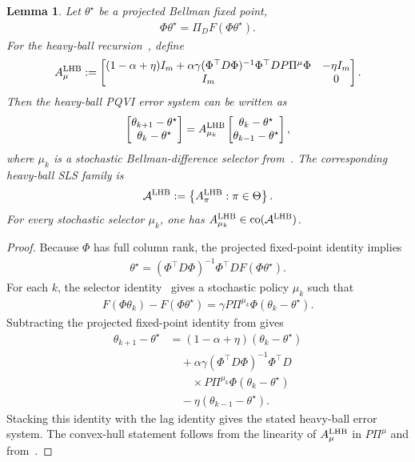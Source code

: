 \documentclass[letterpaper]{article}
\numberwithin{equation}{section}
\newtheorem{lemma}{Lemma}[section]
\newcommand{\co}{\operatorname{co}}
\begin{document}
\begin{lemma}
\label{lem:linear-fa-heavy-ball-switching-system}
Let $\theta^\star$ be a projected Bellman fixed point,
\begin{align*}
  \Phi\theta^\star=\Pi_D F(\Phi\theta^\star).
\end{align*}
For the heavy-ball recursion~, define
\begin{equation*}
A_\mu^{\rm LHB}:=
  \begin{bmatrix}
    (1-\alpha+\eta)I_m
    +\alpha\gamma(\Phi^\top D\Phi)^{-1}\Phi^\top D P\Pi^\mu\Phi
    & -\eta I_m\\
    I_m&0
  \end{bmatrix}.
\end{equation*}
Then the heavy-ball PQVI error system can be written as
\begin{align*}
  \begin{bmatrix}\theta_{k+1}-\theta^\star\\\theta_k-\theta^\star\end{bmatrix}
  =A_{\mu_k}^{\rm LHB}
  \begin{bmatrix}\theta_k-\theta^\star\\\theta_{k-1}-\theta^\star\end{bmatrix},
\end{align*}
where $\mu_k$ is a stochastic Bellman-difference selector from~. The corresponding heavy-ball SLS family is
\begin{align*}
  \mathcal A^{\rm LHB}:=\left\{A_\pi^{\rm LHB}:\pi\in\Theta\right\}.
\end{align*}
For every stochastic selector $\mu_k$, one has
$A_{\mu_k}^{\rm LHB}\in\co(\mathcal A^{\rm LHB})$.
\end{lemma}
\begin{proof}
Because $\Phi$ has full column rank, the projected fixed-point identity implies
\begin{align*}
  \theta^\star=(\Phi^\top D\Phi)^{-1}\Phi^\top DF(\Phi\theta^\star).
\end{align*}
For each $k$, the selector identity~
gives a stochastic policy $\mu_k$ such that
\begin{align*}
  F(\Phi\theta_k)-F(\Phi\theta^\star)
  =\gamma P\Pi^{\mu_k}\Phi(\theta_k-\theta^\star).
\end{align*}
Subtracting the projected fixed-point identity from
 gives
\begin{align*}
\theta_{k+1}-\theta^\star
  &=(1-\alpha+\eta)(\theta_k-\theta^\star)\\
  &\quad+\alpha\gamma(\Phi^\top D\Phi)^{-1}\Phi^\top D\\
  &\qquad\times P\Pi^{\mu_k}\Phi(\theta_k-\theta^\star)\\
  &\quad-\eta(\theta_{k-1}-\theta^\star).
\end{align*}
Stacking this identity with the lag identity gives the stated heavy-ball error
system. The convex-hull statement follows from the linearity of $A_\mu^{\rm LHB}$
in $P\Pi^\mu$ and from~.
\end{proof}
\end{document}
